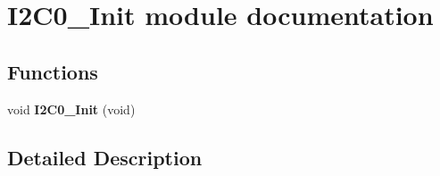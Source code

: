 \hypertarget{group___i2_c0___init__module}{}\section{I2\+C0\+\_\+\+Init module documentation}
\label{group___i2_c0___init__module}
\subsection*{Functions}
\begin{DoxyCompactItemize}
\item 
void {\bfseries I2\+C0\+\_\+\+Init} (void)\hypertarget{group___i2_c0___init__module_ga7386c40b358b807fe6020408c1129404}{}\label{group___i2_c0___init__module_ga7386c40b358b807fe6020408c1129404}

\end{DoxyCompactItemize}


\subsection{Detailed Description}
